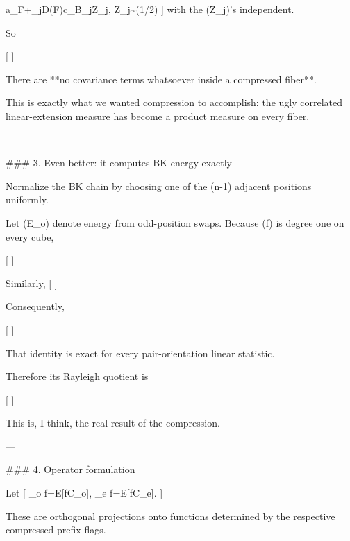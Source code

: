 a_F+\sum_{j\in D(F)}c_{B_j}Z_j,
\qquad
Z_j\sim{}(1/2)
]
with the (Z_j)'s independent.

So

[
]

There are **no covariance terms whatsoever inside a compressed fiber**.

This is exactly what we wanted compression to accomplish: the ugly correlated linear-extension measure has become a product measure on every fiber.

---

### 3. Even better: it computes BK energy exactly

Normalize the BK chain by choosing one of the (n-1) adjacent positions uniformly.

Let (\mathcal E_o) denote energy from odd-position swaps. Because (f) is degree one on every cube,

[
]

Similarly,
[
]

Consequently,

[
\tag{*}
]

That identity is exact for every pair-orientation linear statistic.

Therefore its Rayleigh quotient is

[
\tag{**}
]

This is, I think, the real result of the compression.

---

### 4. Operator formulation

Let
[
\Pi_o f=\mathbb E[f\mid C_o],
\qquad
\Pi_e f=\mathbb E[f\mid C_e].
]

These are orthogonal projections onto functions determined by the respective compressed prefix flags.

